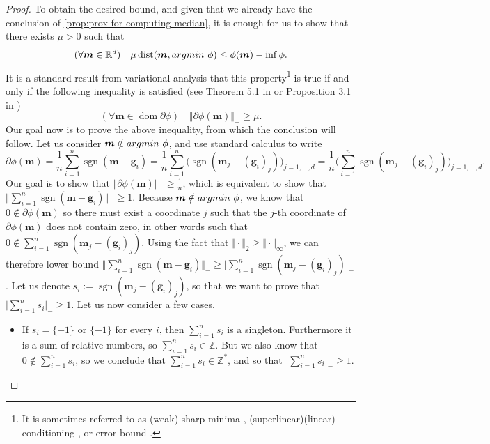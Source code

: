 \documentclass[10pt]{article} %
\newcommand{\m}{\bm{m}}
\newcommand{\bg}{\bm{g}}
\DeclareMathOperator{\sgn}{sgn}
\let\temp\phi
\let\phi\varphi
\let\varphi\temp
\DeclareMathOperator{\dom}{dom}
\DeclareMathOperator{\Dist}{dist}
\begin{document}
\begin{proof}
    To obtain the desired bound, and given that we already have the conclusion of \cref{prop:prox for computing median}, it is enough for us to show that there exists $\mu >0$ such that 
    \begin{equation*}
        (\forall \m \in \mathbb{R}^d) \quad \mu \Dist(\m, {\rm{argmin}}~\varphi) \leq \varphi(\m) - \inf \varphi.
    \end{equation*} 
    It is a standard result from variational analysis that this property\footnote{It is sometimes referred to as  (weak) sharp minima \citep{Fer91,BurFer93}, (superlinear)(linear) conditioning \citep{Lem92,CorJouZal97,Lem98}, or error bound \citep{LewPan98}.} is true if and only if the following inequality is satisfied (see Theorem 5.1 in \citet{CorJouZal97} or Proposition 3.1 in \citet{Lem98})
    \begin{equation*}
         (\forall \m \in \dom \partial \varphi) \quad \Vert \partial \varphi(\m) \Vert_- \geq \mu.
    \end{equation*}
    Our goal now is to prove the above inequality, from which the conclusion will follow. 
    Let us consider $\m \notin {\rm{argmin}}~\varphi$, and use standard calculus to write 
    \begin{equation*}
        \partial \varphi(\m) = \frac{1}{n} \sum_{i=1}^n \sgn(\m-{\bg}_i)
        =
        \frac{1}{n}
        \sum_{i=1}^n
        \big(\sgn(\m_j-({\bg}_i)_j)\big)_{j=1,\ldots,d}
        =
        \frac{1}{n}
        \Big(\sum_{i=1}^n \sgn(\m_j-({\bg}_i)_j) \Big)_{j=1,\ldots,d}.
    \end{equation*}
    Our goal is to show that $\Vert \partial \varphi(\m) \Vert_- \geq \frac{1}{n}$, which is equivalent to show that $\Vert\sum_{i=1}^n \sgn(\m-{\bg}_i) \Vert_- \geq 1$. 
    Because $\m \notin {\rm{argmin}}~\varphi$, we know that $0 \notin \partial \varphi(\m)$ so there must exist a coordinate $j$ such that the $j$-th coordinate of $\partial \varphi(\m)$ does not contain zero, in other words such that $0 \notin \sum_{i=1}^n \sgn(\m_j-({\bg}_i)_j)$.
    Using the fact that $\Vert \cdot \Vert_2 \geq \Vert \cdot \Vert_\infty$, we can therefore lower bound $\Vert\sum_{i=1}^n \sgn(\m-{\bg}_i) \Vert_- \geq \vert \sum_{i=1}^n \sgn(\m_j-({\bg}_i)_j) \vert_-$.
    Let us denote $s_i := \sgn(\m_j - ({\bg}_i)_j)$, so that we want to prove that $\vert \sum_{i=1}^n s_i \vert_- \geq 1$.
    Let us now consider a few cases.
    \begin{itemize}
        \item If $s_i = \{+1\}$ or $\{-1\}$ for every $i$, then $\sum_{i=1}^n s_i$ is a singleton. Furthermore it is a sum of relative numbers, so $\sum_{i=1}^n s_i \in \mathbb{Z}$. But we also know that $0 \notin \sum_{i=1}^n s_i$, so we conclude that $\sum_{i=1}^n s_i \in \mathbb{Z}^*$, and so that $\vert \sum_{i=1}^n s_i \vert_- \geq 1$.

\end{itemize}
\end{proof}
\end{document}
